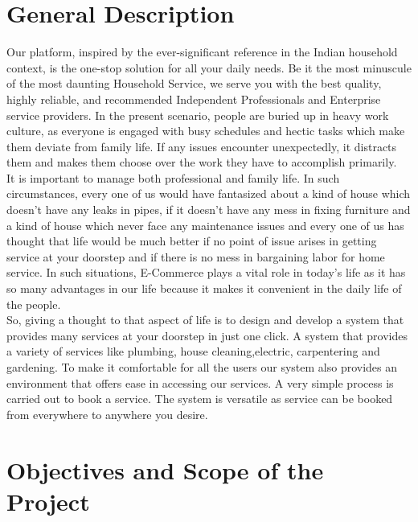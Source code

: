\documentclass[12pt,a4paper]{report}
\begin{document}
\begin{titlepage}
{\section{ General Description }
\vspace{0.5cm}
Our platform, inspired by the ever-significant reference in the Indian household context, is
the one-stop solution for all your daily needs. Be it the most minuscule of the most daunting
Household Service, we serve you with the best quality, highly reliable, and recommended
Independent Professionals and Enterprise service providers.
In the present scenario, people are buried up in heavy work culture, as everyone is engaged with
busy schedules and hectic tasks which make them deviate from family life. If any issues encounter
unexpectedly, it distracts them and makes them choose over the work they have to accomplish
primarily.\\ 
It is important to manage both professional and family life. In such circumstances, every one of us
would have fantasized about a kind of house which doesn’t have any leaks in pipes, if it doesn’t have
any mess in fixing furniture and a kind of house which never face any maintenance issues and every
one of us has thought that life would be much better if no point of issue arises in getting service at
your doorstep and if there is no mess in bargaining labor for home service. In such situations,
E-Commerce plays a vital role in today’s life as it has so many advantages in our life because it
makes it convenient in the daily life of the people.\\ 
So, giving a thought to that aspect of life is to design and develop a system that provides many
services at your doorstep in just one click. A system that provides a variety of services like
plumbing, house cleaning,electric, carpentering and gardening. To make it comfortable for all the
users our system also provides an environment that offers ease in accessing our services. A very
simple process is carried out to book a service. The system is versatile as service can be booked
from everywhere to anywhere you desire.\\
\section{ Objectives and Scope of the Project }
\vspace{0.5cm}
}
\end{titlepage}
\end{document}
